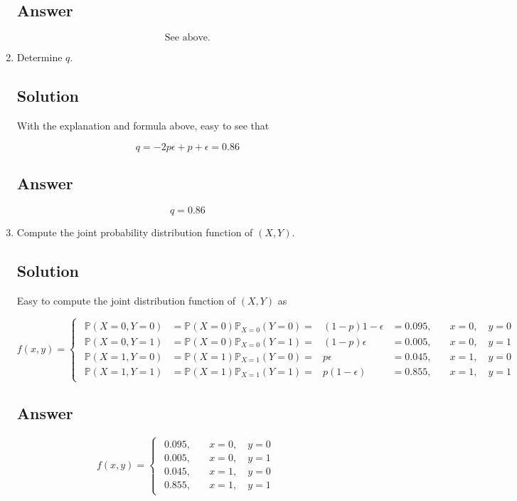 \documentclass[12pt]{article}
\newcommand{\bP}{\mathbb{P}}
\begin{document}
\begin{enumerate}[start=1,label={\bfseries Part \arabic*:},leftmargin=0in]
		\subsection*{Answer}
		
			\[\boxed{\text{See above.}}\]
		
		\bigskip\item Determine $q$.
		
		\subsection*{Solution}
		
			With the explanation and formula above, easy to see that
		
			\[q = -2p\epsilon + p + \epsilon = 0.86\]
		
		\subsection*{Answer}
		
			\[\boxed{q = 0.86}\]
			
		\bigskip\item Compute the joint probability distribution function of $(X,Y)$.
		
		\subsection*{Solution}
		
			Easy to compute the joint distribution function of $(X,Y)$ as
			
			\[
				f(x,y) =
					\begin{cases}
						\begin{aligned}
							\bP(X=0,Y=0) &= \bP(X=0)\bP_{X = 0}(Y = 0) = &(1-p)1 - \epsilon &= 0.095,&\quad x = 0,\quad y = 0\\
							\bP(X=0,Y=1) &= \bP(X=0)\bP_{X = 0}(Y = 1) = &(1-p)\epsilon &= 0.005,&\quad x = 0,\quad y = 1\\
							\bP(X=1,Y=0) &= \bP(X=1)\bP_{X = 1}(Y = 0) = &p\epsilon &= 0.045,&\quad x = 1,\quad y = 0\\
							\bP(X=1,Y=1) &= \bP(X=1)\bP_{X = 1}(Y = 1) = &p(1 - \epsilon) &= 0.855,&\quad x = 1,\quad y = 1
						\end{aligned}
					\end{cases}
			\]
		
		\subsection*{Answer}
		
			\[\boxed{f(x,y) =
				\begin{cases}
					\begin{aligned}
						0.095,&\quad x = 0,\quad y = 0\\
						0.005,&\quad x = 0,\quad y = 1\\
						0.045,&\quad x = 1,\quad y = 0\\
						0.855,&\quad x = 1,\quad y = 1
					\end{aligned}
			\end{cases}}\]
	\end{enumerate}
	
\end{document}
